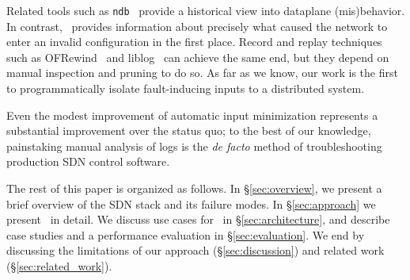 Related tools such as {\tt ndb}~\cite{handigol2012debugger} provide
a historical view into dataplane (mis)behavior. In contrast, \simulator~provides
information about precisely what caused the network to
enter an invalid
configuration in the first place. Record and replay techniques such as
OFRewind~\cite{ofrewind} and liblog~\cite{Geels:2006:RDD:1267359.1267386}
can achieve the same end, but they depend on manual inspection and pruning
to do so. As far as we know, our work
is the first to programmatically isolate fault-inducing inputs to a distributed
system.

Even the modest improvement of automatic input minimization
represents a substantial improvement over the status quo;
to the best of our knowledge, painstaking manual analysis of logs is the
{\em de facto} method of troubleshooting production SDN control software.


The rest of this paper is organized as follows. In \S\ref{sec:overview},
we present a brief overview of the SDN stack and its failure modes.
In \S\ref{sec:approach} we present \simulator~in detail.
We discuss use cases for \simulator~in \S\ref{sec:architecture},
and describe case studies and a performance evaluation in
\S\ref{sec:evaluation}. We end by discussing the limitations of our
approach (\S\ref{sec:discussion}) and related work (\S\ref{sec:related_work}).


